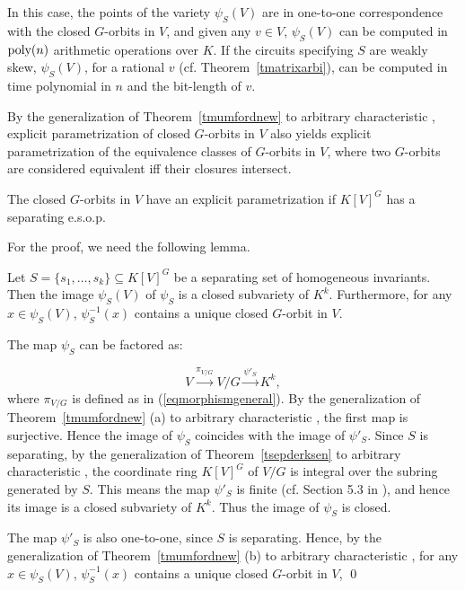 \documentclass[11pt]{article}
\begin{document}
In this case, the points of the variety $\psi_S(V)$ are in one-to-one correspondence
with the closed $G$-orbits in $V$, and given any $v \in V$, $\psi_S(V)$ can be
computed in ${\mbox {poly}}(n)$ arithmetic operations over $K$. If 
the circuits specifying $S$ are   weakly skew, $\psi_S(V)$,
for a rational $v$ (cf. Theorem~\ref{tmatrixarbi}), can  be computed in time polynomial in $n$ and  the bit-length of $v$.

By the generalization of Theorem~\ref{tmumfordnew} to arbitrary characteristic \cite{mumford}, 
explicit parametrization of closed $G$-orbits in $V$ also yields explicit parametrization of 
the equivalence classes of $G$-orbits in $V$, where two $G$-orbits are considered equivalent iff their closures intersect.

\begin{theorem} \label{texppara}
The closed $G$-orbits in $V$ have an explicit parametrization
if $K[V]^G$ has a separating e.s.o.p.
\end{theorem}

For the proof, we need the following lemma.

\begin{lemma} \label{lderksenpara}
Let $S =\{s_1,\ldots,s_k\} \subseteq K[V]^G$ be a 
separating set of homogeneous invariants.
Then the image $\psi_S(V)$ of $\psi_S$ is a closed subvariety of $K^k$.
Furthermore, for any $x \in \psi_S(V)$, $\psi_S^{-1}(x)$ contains a unique closed $G$-orbit in $V$.
\end{lemma}
\proof The map $\psi_S$ can be factored as: 

\begin{equation} \label{eqfactorpi}
V \stackrel{\pi_{V/G}}{\longrightarrow} V/G  \stackrel {\psi'_S} {\longrightarrow}  K^k,
\end{equation}
where $\pi_{V/G}$ is defined as in (\ref{eqmorphismgeneral}).
By the generalization of Theorem~\ref{tmumfordnew} (a) to arbitrary 
characteristic \cite{mumford},
the first map is surjective.
Hence the image of $\psi_S$ coincides with the image of $\psi'_S$. 
Since $S$ is separating, by the generalization of Theorem~\ref{tsepderksen} to arbitrary
characteristic \cite{derksenbook}, 
the coordinate ring $K[V]^G$ of $V/G$ is integral over 
the subring generated by $S$. This means the map $\psi'_S$ is finite
(cf. Section 5.3 in \cite{shafa}), and hence its image is a closed 
subvariety of $K^k$. Thus  the image of $\psi_S$ is closed.

The map $\psi'_S$ is also one-to-one, since $S$ is separating. 
Hence, by the generalization of Theorem~\ref{tmumfordnew} (b) to
arbitrary characteristic \cite{mumford}, for 
any $x \in \psi_S(V)$, $\psi_S^{-1}(x)$ contains a unique closed $G$-orbit in $V$,
\qed 
\end{document}
